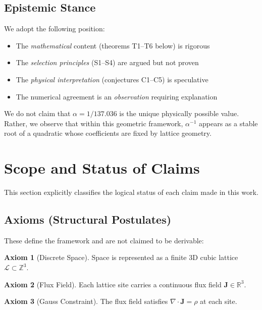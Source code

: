 \documentclass[11pt,a4paper]{article}
\theoremstyle{definition}
\newtheorem{axiom}{Axiom}
\theoremstyle{remark}
\newcommand{\Zthree}{\mathbb{Z}^3}
\newcommand{\Rthree}{\mathbb{R}^3}
\begin{document}
\subsection{Epistemic Stance}

We adopt the following position:
\begin{itemize}
    \item The \emph{mathematical} content (theorems T1--T6 below) is rigorous
    \item The \emph{selection principles} (S1--S4) are argued but not proven
    \item The \emph{physical interpretation} (conjectures C1--C5) is speculative
    \item The numerical agreement is an \emph{observation} requiring explanation
\end{itemize}

We do not claim that $\alpha = 1/137.036$ is the unique physically possible value. Rather, we observe that within this geometric framework, $\alpha^{-1}$ appears as a stable root of a quadratic whose coefficients are fixed by lattice geometry.

\section{Scope and Status of Claims}

This section explicitly classifies the logical status of each claim made in this work.

\subsection{Axioms (Structural Postulates)}

These define the framework and are not claimed to be derivable:

\begin{axiom}[Discrete Space]
Space is represented as a finite 3D cubic lattice $\mathcal{L} \subset \Zthree$.
\end{axiom}

\begin{axiom}[Flux Field]
Each lattice site carries a continuous flux field $\mathbf{J} \in \Rthree$.
\end{axiom}

\begin{axiom}[Gauss Constraint]
The flux field satisfies $\nabla \cdot \mathbf{J} = \rho$ at each site.
\end{axiom}
\end{document}
